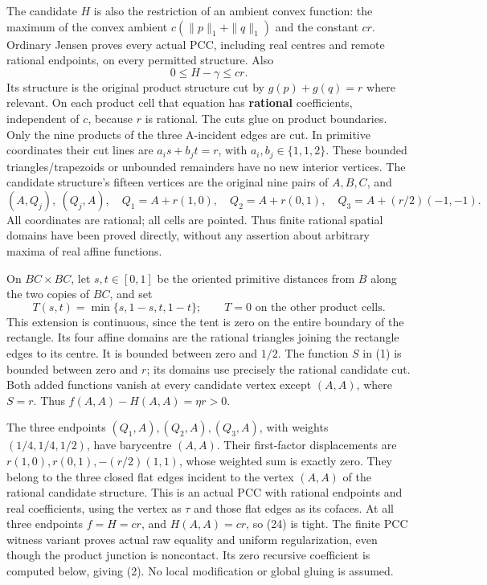 \documentclass[
  10pt,
]{article}
\begin{document}
The candidate \(H\) is also the restriction of an ambient convex
function: the maximum of the convex ambient \(c(\|p\|_1+\|q\|_1)\) and
the constant \(cr\). Ordinary Jensen proves every actual PCC, including
real centres and remote rational endpoints, on every permitted
structure. Also \[
 0\leq H-\gamma\leq cr.                                      \tag{13}
\] Its structure is the original product structure cut by
\(g(p)+g(q)=r\) where relevant. On each product cell that equation has
\textbf{rational} coefficients, independent of \(c\), because \(r\) is
rational. The cuts glue on product boundaries. Only the nine products of
the three A-incident edges are cut. In primitive coordinates their cut
lines are \(a_is+b_jt=r\), with \(a_i,b_j\in\{1,1,2\}\). These bounded
triangles/trapezoids or unbounded remainders have no new interior
vertices. The candidate structure's fifteen vertices are the original
nine pairs of \(A,B,C\), and \[
 (A,Q_j),\ (Q_j,A),\quad
 Q_1=A+r(1,0),\quad Q_2=A+r(0,1),\quad Q_3=A+(r/2)(-1,-1).     \tag{14}
\] All coordinates are rational; all cells are pointed. Thus finite
rational spatial domains have been proved directly, without any
assertion about arbitrary maxima of real affine functions.

On \(BC\times BC\), let \(s,t\in[0,1]\) be the oriented primitive
distances from \(B\) along the two copies of \(BC\), and set \[
 T(s,t)=\min\{s,1-s,t,1-t\};\qquad T=0\text{ on the other product cells}. \tag{15}
\] This extension is continuous, since the tent is zero on the entire
boundary of the rectangle. Its four affine domains are the rational
triangles joining the rectangle edges to its centre. It is bounded
between zero and \(1/2\). The function \(S\) in (1) is bounded between
zero and \(r\); its domains use precisely the rational candidate cut.
Both added functions vanish at every candidate vertex except \((A,A)\),
where \(S=r\). Thus \(f(A,A)-H(A,A)=\eta r>0\).

The three endpoints \((Q_1,A),(Q_2,A),(Q_3,A)\), with weights
\((1/4,1/4,1/2)\), have barycentre \((A,A)\). Their first-factor
displacements are \(r(1,0),r(0,1),-(r/2)(1,1)\), whose weighted sum is
exactly zero. They belong to the three closed flat edges incident to the
vertex \((A,A)\) of the rational candidate structure. This is an actual
PCC with rational endpoints and real coefficients, using the vertex as
\(\tau\) and those flat edges as its cofaces. At all three endpoints
\(f=H=cr\), and \(H(A,A)=cr\), so (24) is tight. The finite PCC witness
variant proves actual raw equality and uniform regularization, even
though the product junction is noncontact. Its zero recursive
coefficient is computed below, giving (2). No local modification or
global gluing is assumed.
\end{document}
